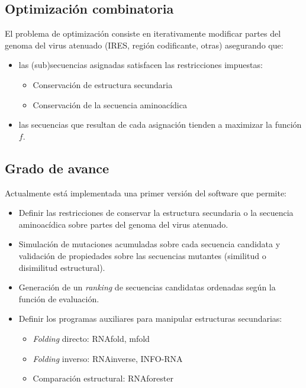 \documentclass{beamer}
\begin{document}
\subsection{Optimizaci\'on combinatoria}
\begin{frame}
El problema de optimizaci\'on consiste en iterativamente modificar partes
del genoma del virus atenuado (IRES, regi\'on codificante, otras) asegurando
que:
  \begin{itemize}
   \item las (sub)secuencias asignadas satisfacen las restricciones impuestas:
    \begin{itemize}
     \item Conservaci\'on de estructura secundaria
     \item Conservaci\'on de la secuencia aminoac\'idica
    \end{itemize}
   \item las secuencias que resultan de cada asignaci\'on tienden a maximizar la
funci\'on $f$.
  \end{itemize}
\end{frame}

\subsection{Grado de avance}
\begin{frame}
Actualmente est\'a implementada una primer versi\'on del software que permite:
  \begin{itemize}
   \item Definir las restricciones de conservar la estructura secundaria o la
secuencia aminoac\'idica sobre partes del genoma del virus atenuado.
   \item Simulaci\'on de mutaciones acumuladas sobre cada secuencia candidata
y validaci\'on de propiedades sobre las secuencias mutantes (similitud o
disimilitud estructural).
   \item Generaci\'on de un \textit{ranking} de secuencias candidatas ordenadas
seg\'un la funci\'on de evaluaci\'on.
   \item Definir los programas auxiliares para manipular estructuras
secundarias:
    \begin{itemize}
     \item \textit{Folding} directo: RNAfold, mfold
     \item \textit{Folding} inverso: RNAinverse, INFO-RNA
     \item Comparaci\'on estructural: RNAforester
    \end{itemize}
  \end{itemize}
\end{frame}
\end{document}
